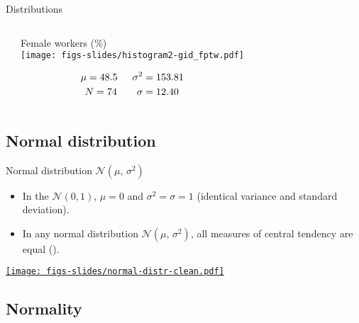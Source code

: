 \documentclass{beamer}
\begin{document}
\begin{frame}[t]{Distributions}
\begin{columns}[t]
\begin{center}
			\end{center}
			
			\begin{center}
			Female workers (\%)\\[.5em]
			\texttt{[image: figs-slides/histogram2-gid\_fptw.pdf]}
			
			\vspace{-2.5em}
			\begin{align*}
			\mu = 48.5\hspace{1.5em}\sigma^2 &= 153.81\\
			N = 74\hspace{2em}\sigma &= 12.40
			\end{align*}
			\end{center}
	\end{columns}
			
	\end{frame}
	
	\subsection{Normal distribution}

	\begin{frame}[t]{Normal distribution $\mathcal{N}(\mu,\,\sigma^2)$}
	
	\begin{itemize}	
		\item In the  $\mathcal{N}(0,1)$, $\mu = 0$ and $\sigma^2 = \sigma = 1$ (identical variance and standard deviation).

		\item In any normal distribution $\mathcal{N}(\mu,\,\sigma^2)$, all measures of central tendency are equal ().
	\end{itemize}

	\begin{center}
		\href{http://en.wikipedia.org/wiki/Normal_distribution}{\texttt{[image: figs-slides/normal-distr-clean.pdf]}}
	\end{center}
	
	\end{frame}

	\subsection{Normality}
	
\end{document}
